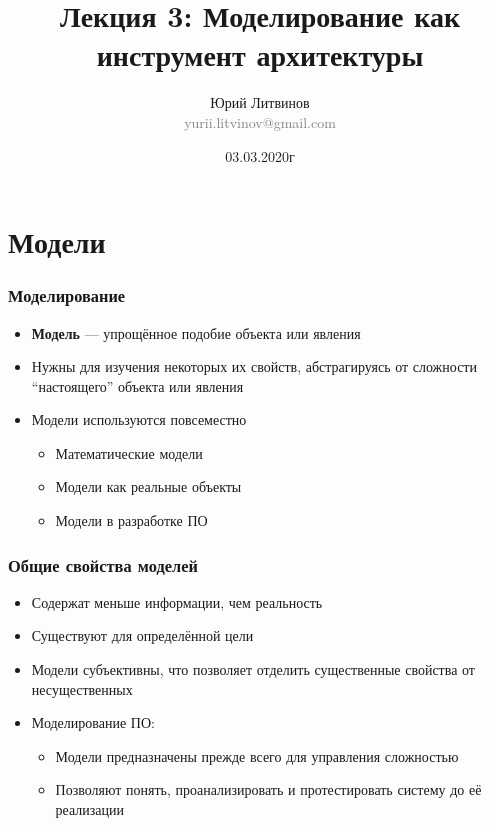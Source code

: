 \documentclass[xetex,mathserif,serif]{beamer}
\title[Моделирование]{Лекция 3: Моделирование как инструмент архитектуры}
\author[Юрий Литвинов]{Юрий Литвинов\\\small{\textcolor{gray}{yurii.litvinov@gmail.com}}}
\date{03.03.2020г}
\begin{document}
	\frame{\titlepage}

	\section{Модели}

	\begin{frame}
		\frametitle{Моделирование}
		\begin{itemize}
			\item \textbf{Модель} --- упрощённое подобие объекта или явления
			\item Нужны для изучения некоторых их свойств, абстрагируясь от сложности ``настоящего'' объекта или явления
			\item Модели используются повсеместно
			\begin{itemize}
				\item Математические модели
				\item Модели как реальные объекты
				\item Модели в разработке ПО
			\end{itemize}
		\end{itemize}
	\end{frame}

	\begin{frame}
		\frametitle{Общие свойства моделей}
		\begin{itemize}
			\item Содержат меньше информации, чем реальность
			\item Существуют для определённой цели
			\item Модели субъективны, что позволяет отделить существенные свойства от несущественных
			\item Моделирование ПО:
			\begin{itemize}
				\item Модели предназначены прежде всего для управления сложностью
				\item Позволяют понять, проанализировать и протестировать систему до её реализации
			\end{itemize}
		\end{itemize}

	\end{frame}
\end{document}
